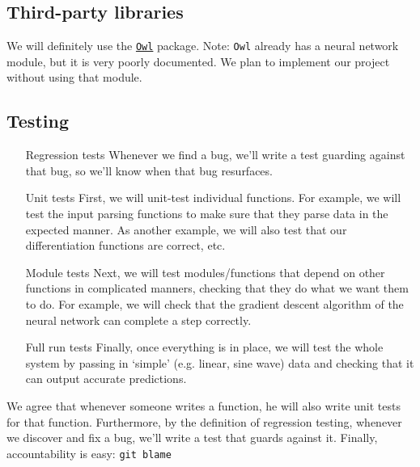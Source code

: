 \documentclass{article}
\begin{document}
\subsection{Third-party libraries}

We will definitely use the \href{https://opam.ocaml.org/packages/owl/}{\texttt{Owl}} package. Note: \texttt{Owl} already has a neural network module, but it is very poorly documented. We plan to implement our project without using that module.

\subsection{Testing}

\begin{itemize}[leftmargin=3cm]

\item[Regression tests] Whenever we find a bug, we'll write a test guarding against that bug, so we'll know when that bug resurfaces.

\item[Unit tests] First, we will unit-test individual functions. For example, we will test the input parsing functions to make sure that they parse data in the expected manner. As another example, we will also test that our differentiation functions are correct, etc.

\item[Module tests] Next, we will test modules/functions that depend on other functions in complicated manners, checking that they do what we want them to do. For example, we will check that the gradient descent algorithm of the neural network can complete a step correctly.

\item[Full run tests] Finally, once everything is in place, we will test the whole system by passing in `simple' (e.g. linear, sine wave) data and checking that it can output accurate predictions.

\end{itemize}

We agree that whenever someone writes a function, he will also write unit tests for that function. Furthermore, by the definition of regression testing, whenever we discover and fix a bug, we'll write a test that guards against it. Finally, accountability is easy: \texttt{\color{red}git blame}
\end{document}
